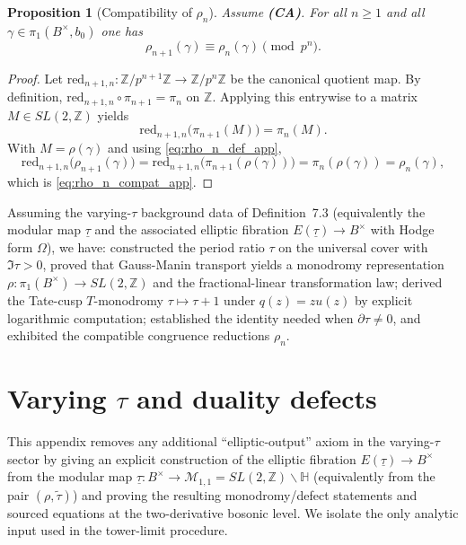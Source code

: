 \documentclass[11pt]{article}
\newtheorem{proposition}[theorem]{Proposition}
\theoremstyle{remark}
\newcommand{\Z}{\mathbb{Z}}
\begin{document}
{\begin{proposition}[Compatibility of $\rho_n$]\label{prop:rho_n_compat}
Assume \textbf{(CA)}. For all $n\ge 1$ and all $\gamma\in\pi_1(B^\times,b_0)$ one has
\begin{equation}\label{eq:rho_n_compat_app}
\rho_{n+1}(\gamma)\equiv \rho_n(\gamma)\pmod{p^n}.
\end{equation}
\end{proposition}
\begin{proof}
Let $\mathrm{red}_{n+1,n}:\mathbb{Z}/p^{n+1}\mathbb{Z}\to \mathbb{Z}/p^{n}\mathbb{Z}$ be the canonical quotient map. By definition, $\mathrm{red}_{n+1,n}\circ \pi_{n+1}=\pi_n$ on $\mathbb{Z}$. Applying this entrywise to a matrix $M\in SL(2,\mathbb{Z})$ yields
\begin{equation}\label{eq:entrywise_reduction}
\mathrm{red}_{n+1,n}\bigl(\pi_{n+1}(M)\bigr)=\pi_n(M).
\end{equation}
With $M=\rho(\gamma)$ and using \eqref{eq:rho_n_def_app},
\begin{equation}\label{eq:rho_compat_calc}
\mathrm{red}_{n+1,n}\bigl(\rho_{n+1}(\gamma)\bigr)=\mathrm{red}_{n+1,n}\bigl(\pi_{n+1}(\rho(\gamma))\bigr)=\pi_n(\rho(\gamma))=\rho_n(\gamma),
\end{equation}
which is \eqref{eq:rho_n_compat_app}.
\end{proof} 
Assuming the varying-$\tau$ background data of Definition~7.3 (equivalently the modular map $\underline{\tau}$
and the associated elliptic fibration $E(\underline{\tau})\to B^\times$ with Hodge form $\Omega$), we have:
constructed the period ratio $\tau$ on the universal cover with $\Im\tau>0$, proved that Gauss-Manin transport
yields a monodromy representation $\rho:\pi_1(B^\times)\to SL(2,\Z)$ and the fractional-linear transformation law;
derived the Tate-cusp $T$-monodromy $\tau\mapsto\tau+1$ under $q(z)=zu(z)$ by explicit logarithmic computation;
established the identity needed when $\partial\tau\neq 0$, and exhibited the compatible congruence reductions
$\rho_n$.


\section{
Varying
\texorpdfstring{$\tau$}{tau} and duality defects
}
\label{app:varying-unconditional}

This appendix removes any additional ``elliptic-output'' axiom in the varying-$\tau$
sector by giving an explicit construction of the elliptic fibration
$E(\underline{\tau}) \to B^{\times}$ from the modular map
$\underline{\tau}  : B^{\times} \to \mathcal{M}_{1,1}
= SL(2,\mathbb{Z}) \backslash \mathbb{H}$
(equivalently from the pair $(\rho,\widetilde{\tau})$)
and proving the resulting monodromy/defect statements and sourced equations
at the two-derivative bosonic level. We isolate the only analytic input used
in the tower-limit procedure.


}
\end{document}
